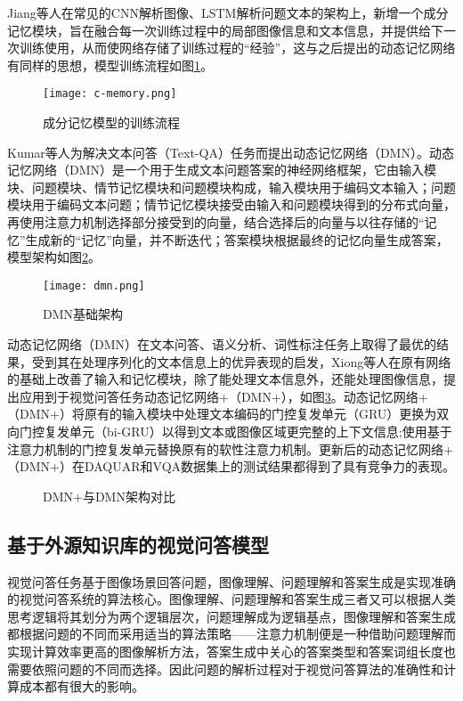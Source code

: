 Jiang等人在常见的CNN解析图像、LSTM解析问题文本的架构上，新增一个成分记忆模块，旨在融合每一次训练过程中的局部图像信息和文本信息，并提供给下一次训练使用，从而使网络存储了训练过程的“经验”，这与之后提出的动态记忆网络有同样的思想，模型训练流程如图\ref{c-memory}。
\begin{figure}[H]
	\centering
	\texttt{[image: c-memory.png]}
	\caption{成分记忆模型的训练流程}
	\label{c-memory}
\end{figure}

Kumar等人为解决文本问答（Text-QA）任务而提出动态记忆网络（DMN）。动态记忆网络（DMN）是一个用于生成文本问题答案的神经网络框架，它由输入模块、问题模块、情节记忆模块和问题模块构成，输入模块用于编码文本输入；问题模块用于编码文本问题；情节记忆模块接受由输入和问题模块得到的分布式向量，再使用注意力机制选择部分接受到的向量，结合选择后的向量与以往存储的“记忆”生成新的“记忆”向量，并不断迭代；答案模块根据最终的记忆向量生成答案，模型架构如图\ref{dmn}。
\begin{figure}[H]
	\centering
	\texttt{[image: dmn.png]}
	\caption{DMN基础架构}
	\label{dmn}
\end{figure}

动态记忆网络（DMN）在文本问答、语义分析、词性标注任务上取得了最优的结果，受到其在处理序列化的文本信息上的优异表现的启发，Xiong等人在原有网络的基础上改善了输入和记忆模块，除了能处理文本信息外，还能处理图像信息，提出应用到于视觉问答任务动态记忆网络+（DMN+），如图\ref{v-dmn}。动态记忆网络+（DMN+）将原有的输入模块中处理文本编码的门控复发单元（GRU）更换为双向门控复发单元（bi-GRU）以得到文本或图像区域更完整的上下文信息;使用基于注意力机制的门控复发单元替换原有的软性注意力机制。更新后的动态记忆网络+（DMN+）在DAQUAR和VQA数据集上的测试结果都得到了具有竞争力的表现。
\begin{figure}[H]
	\centering
	\caption{DMN+与DMN架构对比}
	\label{v-dmn}
\end{figure}

\subsection{基于外源知识库的视觉问答模型}
视觉问答任务基于图像场景回答问题，图像理解、问题理解和答案生成是实现准确的视觉问答系统的算法核心。图像理解、问题理解和答案生成三者又可以根据人类思考逻辑将其划分为两个逻辑层次，问题理解成为逻辑基点，图像理解和答案生成都根据问题的不同而采用适当的算法策略——注意力机制便是一种借助问题理解而实现计算效率更高的图像解析方法，答案生成中关心的答案类型和答案词组长度也需要依照问题的不同而选择。因此问题的解析过程对于视觉问答算法的准确性和计算成本都有很大的影响。

